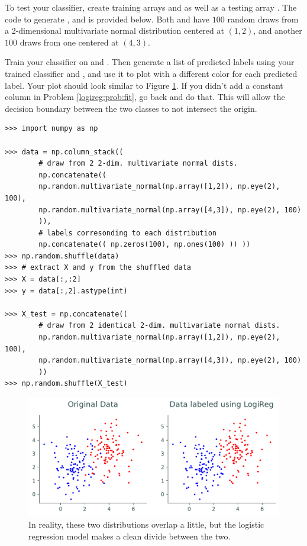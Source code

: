 \begin{problem}
To test your classifier, create training arrays  and  as well as a testing array .
The code to generate ,  and  is provided below.
Both  and  have $100$ random draws from a 2-dimensional multivariate normal distribution centered at $(1,2)$, and another $100$ draws from one centered at $(4,3)$.

Train your classifier on  and . 
Then generate a list of predicted labels using your trained classifier and , and use it to plot  with a different color for each predicted label.
Your plot should look similar to Figure \ref{fig:prob3}.
If you didn't add a constant column in Problem \ref{logireg:prob:fit}, go back and do that.
This will allow the decision boundary between the two classes to not intersect the origin.

\begin{lstlisting}
>>> import numpy as np

>>> data = np.column_stack(( 
        # draw from 2 2-dim. multivariate normal dists.
        np.concatenate(( 
        np.random.multivariate_normal(np.array([1,2]), np.eye(2), 100),
        np.random.multivariate_normal(np.array([4,3]), np.eye(2), 100) 
        )), 
        # labels corresonding to each distribution
        np.concatenate(( np.zeros(100), np.ones(100) )) ))
>>> np.random.shuffle(data)
>>> # extract X and y from the shuffled data
>>> X = data[:,:2]
>>> y = data[:,2].astype(int)

>>> X_test = np.concatenate(( 
        # draw from 2 identical 2-dim. multivariate normal dists.
        np.random.multivariate_normal(np.array([1,2]), np.eye(2), 100),
        np.random.multivariate_normal(np.array([4,3]), np.eye(2), 100) 
        ))
>>> np.random.shuffle(X_test)
\end{lstlisting}
\end{problem}

\begin{figure}[H]
    \includegraphics[width=.9\textwidth]{figures/prob3_test.pdf}
    \caption{In reality, these two distributions overlap a little, but the logistic regression model makes a clean divide between the two.}
    \label{fig:prob3}
\end{figure}


